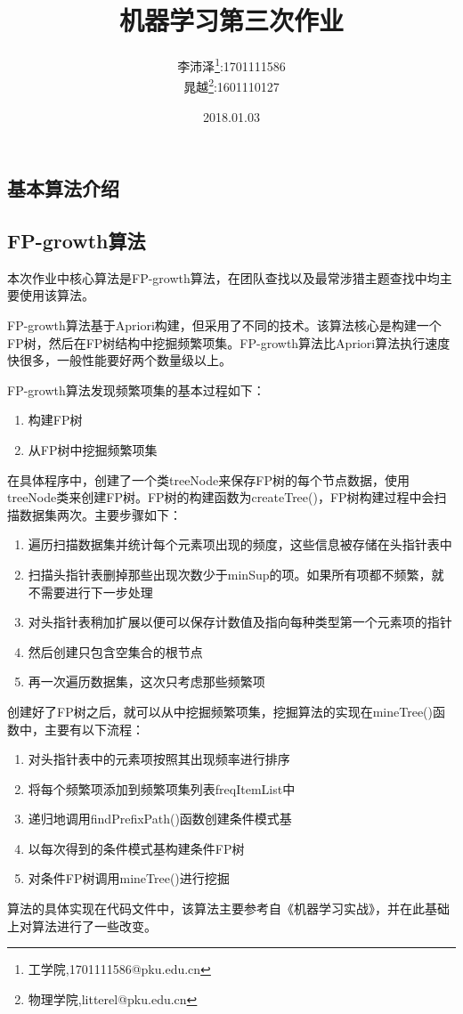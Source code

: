\documentclass[a4paper,oneside,12pt]{article}
\title{机器学习第三次作业}
\author{李沛泽\footnote{工学院,1701111586@pku.edu.cn}:1701111586 \\晁越\footnote{物理学院,litterel@pku.edu.cn}:1601110127}
\date{2018.01.03}
\begin{document}

\begin{spacing}{1.5}%

\maketitle
\newpage
\tableofcontents
\newpage


\section{基本算法介绍}
\subsection{FP-growth算法}
本次作业中核心算法是FP-growth算法，在团队查找以及最常涉猎主题查找中均主要使用该算法。\par
FP-growth算法基于Apriori构建，但采用了不同的技术。该算法核心是构建一个FP树，然后在FP树结构中挖掘频繁项集。FP-growth算法比Apriori算法执行速度快很多，一般性能要好两个数量级以上。\par
FP-growth算法发现频繁项集的基本过程如下：
\begin{enumerate}
\item 构建FP树
\item 从FP树中挖掘频繁项集
\end{enumerate}
\par
在具体程序中，创建了一个类treeNode来保存FP树的每个节点数据，使用treeNode类来创建FP树。FP树的构建函数为createTree()，FP树构建过程中会扫描数据集两次。主要步骤如下：
\begin{enumerate}
\item 遍历扫描数据集并统计每个元素项出现的频度，这些信息被存储在头指针表中
\item 扫描头指针表删掉那些出现次数少于minSup的项。如果所有项都不频繁，就不需要进行下一步处理
\item 对头指针表稍加扩展以便可以保存计数值及指向每种类型第一个元素项的指针
\item 然后创建只包含空集合的根节点
\item 再一次遍历数据集，这次只考虑那些频繁项
\end{enumerate}
\par
创建好了FP树之后，就可以从中挖掘频繁项集，挖掘算法的实现在mineTree()函数中，主要有以下流程：
\begin{enumerate}
\item 对头指针表中的元素项按照其出现频率进行排序
\item 将每个频繁项添加到频繁项集列表freqItemList中
\item 递归地调用findPrefixPath()函数创建条件模式基
\item 以每次得到的条件模式基构建条件FP树
\item 对条件FP树调用mineTree()进行挖掘
\end{enumerate}
\par
算法的具体实现在代码文件中，该算法主要参考自《机器学习实战》，并在此基础上对算法进行了一些改变。

\end{spacing}
\end{document}
